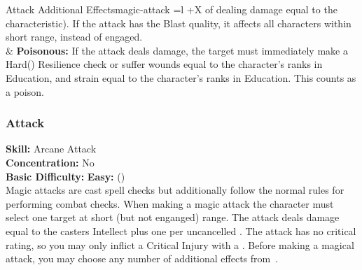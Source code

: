 \begin{table*}[!htb]
\begin{GenesysTable}{Attack Additional Effects}{magic-attack}{ =l +X}
                            of dealing damage equal to the characteristic). If the attack has the  Blast quality, it affects
                            all characters within short range, instead of engaged.\\
\difficulty\difficulty  & \textbf{Poisonous:} If the attack deals damage, the target must immediately make a
                            Hard(\difficulty\difficulty\difficulty) Resilience check or suffer wounds equal to the character's
                            ranks in Education, and strain equal to the character's ranks in Education. This counts as a poison.\\
\end{GenesysTable}
\end{table*}

\subsubsection{Attack}
\textbf{Skill:} Arcane Attack\\
\textbf{Concentration:} No\\
\textbf{Basic Difficulty:} \textbf{Easy:} (\difficulty)\\
Magic attacks are cast spell checks but additionally follow the normal rules for
performing combat checks. When making a magic attack the character must select
one target at short (but not enganged) range. The attack deals damage equal to
the casters Intellect plus one per uncancelled \success. The attack has no
critical rating, so you may only inflict a Critical Injury with a \triumph.
Before making a magical attack, you may choose any number of additional effects
from~.


